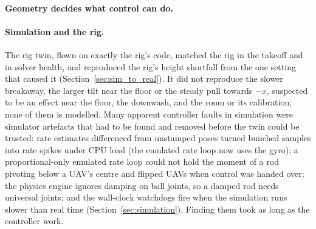 \paragraph{Geometry decides what control can do.}

\paragraph{Simulation and the rig.} The rig twin, flown on exactly the rig's code, matched the rig in the
takeoff and in solver health, and reproduced the rig's height shortfall from the one setting that caused it
(Section~\ref{sec:sim_to_real}). It did not reproduce the slower breakaway, the larger tilt near the floor or
the steady pull towards $-x$, suspected to be an effect near the floor, the downwash, and the room or its
calibration; none of them is modelled. Many apparent controller faults in simulation were simulator artefacts
that had to be found and removed before the twin could be trusted: rate estimates differenced from unstamped
poses turned bunched samples into rate spikes under CPU load (the emulated rate loop now uses the gyro); a
proportional-only emulated rate loop could not hold the moment of a rod pivoting below a UAV's centre and
flipped UAVs when control was handed over; the physics engine ignores damping on ball joints, so a damped rod
needs universal joints; and the wall-clock watchdogs fire when the simulation runs slower than real time
(Section~\ref{sec:simulation}). Finding them took as long as the controller work.

